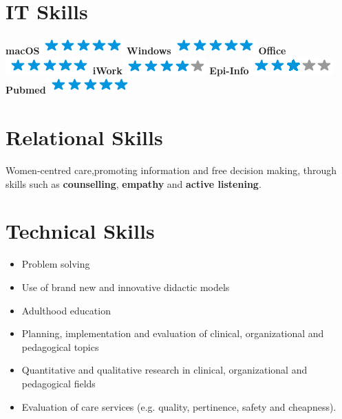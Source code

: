 \documentclass[11pt, print]{friggeri-cv}
\begin{document}
\newpage
\begin{aside}
	\section{IT Skills}
	\textbf{macOS}\includegraphics[scale=0.40]{img/5stars.png}
	\textbf{Windows}\includegraphics[scale=0.40]{img/5stars.png}
	\textbf{Office}\includegraphics[scale=0.40]{img/5stars.png}
	\textbf{iWork}\includegraphics[scale=0.40]{img/4stars.png}
	\textbf{Epi-Info}\includegraphics[scale=0.40]{img/3stars.png}
	\textbf{Pubmed}\includegraphics[scale=0.40]{img/5stars.png}
	~
	~
	\section{Relational Skills}
	Women-centred care,promoting information and free decision making, through skills such as \textbf{counselling}, \textbf{empathy} and \textbf{active listening}.
\end{aside}


\section{Technical Skills}
	\begin{itemize}
		\item Problem solving
		\item Use of brand new and innovative didactic models
		\item Adulthood education
		\item Planning, implementation and evaluation of clinical, organizational and pedagogical topics
		\item Quantitative and qualitative research in clinical, organizational and pedagogical fields
		\item Evaluation of care services (e.g. quality, pertinence, safety and cheapness).
	\end{itemize}
\vspace{10pt}
\end{document}
